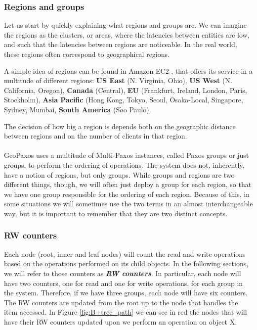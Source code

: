 \subsubsection{Regions and groups}
Let us start by quickly explaining what regions and groups are. We can imagine the regions as the clusters, or areas, where the latencies between entities are low, and such that the latencies between regions are noticeable. In the real world, these regions often correspond to geographical regions.

A simple idea of regions can be found in Amazon EC2 \citep{amazonEC2}, that offers its service in a multitude of different regions: \textbf{US East} (N. Virginia, Ohio), \textbf{US West} (N. California, Oregon), \textbf{Canada} (Central), \textbf{EU} (Frankfurt, Ireland, London, Paris, Stockholm), \textbf{Asia Pacific} (Hong Kong, Tokyo, Seoul, Osaka-Local, Singapore, Sydney, Mumbai, \textbf{South America} (S$\tilde{a}$o Paulo).

The decision of how big a region is depends both on the geographic distance between regions and on the number of clients in that region.\\\\
GeoPaxos uses a multitude of Multi-Paxos instances, called Paxos groups or just groups, to perform the ordering of operations. The system does not, inherently, have a notion of regions, but only groups. While groups and regions are two different things, though, we will often just deploy a group for each region, so that we have one group responsible for the ordering of each region. Because of this, in some situations we will sometimes use the two terms in an almost interchangeable way, but it is important to remember that they are two distinct concepts.

\subsubsection{RW counters}
Each node (root, inner and leaf nodes) will count the read and write operations based on the operations performed on its child objects. In the following sections, we will refer to those counters as \textbf{\emph{RW counters}}. In particular, each node will have two counters, one for read and one for write operations, for each group in the system. Therefore, if we have three groups, each node will have six counters. The RW counters are updated from the root up to the node that handles the item accessed. In Figure \ref{fig:B+tree_path} we can see in red the nodes that will have their RW counters updated upon we perform an operation on object X. 


